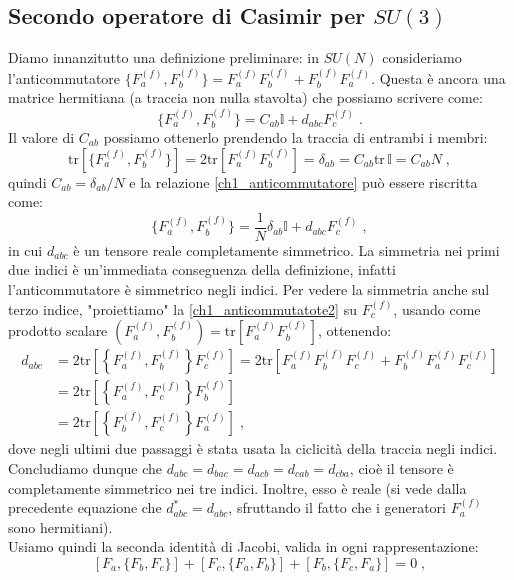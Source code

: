 \documentclass[12pt,a4paper]{article}
\theoremstyle{definition}
\newcommand{\tr}{\mathrm{tr}}
\numberwithin{equation}{section}
\begin{document}
\subsection{Secondo operatore di Casimir per $SU(3)$}
Diamo innanzitutto una definizione preliminare: in $SU(N)$ consideriamo l'anticommutatore $\{F_a^{(f)},F_b^{(f)}\}=F_a^{(f)}F_b^{(f)}+F_b^{(f)}F_a^{(f)}$. Questa è ancora una matrice hermitiana (a traccia non nulla stavolta) che possiamo scrivere come:
\begin{equation}
\{F_a^{(f)},F_b^{(f)}\}=C_{ab}\mathbb{I}+d_{abc}F_c^{(f)}\;. \label{ch1_anticommutatore}
\end{equation}
Il valore di $C_{ab}$ possiamo ottenerlo prendendo la traccia di entrambi i membri:
$$
\tr\left[\{F_a^{(f)},F_b^{(f)}\}\right]=2\tr[F_a^{(f)}F_b^{(f)}]=\delta_{ab}=C_{ab}\tr\,\mathbb{I}=C_{ab}N\;,
$$
quindi $C_{ab}=\delta_{ab}/N$ e la relazione \eqref{ch1_anticommutatore} può essere riscritta come:
\begin{equation}
\{F_a^{(f)},F_b^{(f)}\}=\frac{1}{N}\delta_{ab}\mathbb{I}+d_{abc}F_c^{(f)}\;, \label{ch1_anticommutatote2}
\end{equation}
in cui $d_{abc}$ è un tensore reale completamente simmetrico. La simmetria nei primi due indici è un'immediata conseguenza della definizione, infatti l'anticommutatore è simmetrico negli indici. Per vedere la simmetria anche sul terzo indice, "proiettiamo" la \eqref{ch1_anticommutatote2} su $F_c^{(f)}$, usando come prodotto scalare $(F_a^{(f)},F_b^{(f)})=\tr[F_a^{(f)}F_b^{(f)}]$, ottenendo:
\begin{align*}
d_{abc}&= 2\tr\left[\left\{F_a^{(f)},F_b^{(f)}\right\}F_c^{(f)}\right]=2\tr\left[F_a^{(f)}F_b^{(f)}F_c^{(f)}+F_b^{(f)}F_a^{(f)}F_c^{(f)}\right] \\
&= 2\tr\left[\left\{F_a^{(f)},F_c^{(f)}\right\}F_b^{(f)}\right] \\
&=2 \tr\left[\left\{F_b^{(f)},F_c^{(f)}\right\}F_a^{(f)}\right]\;,
\end{align*}
dove negli ultimi due passaggi è stata usata la ciclicità della traccia negli indici. Concludiamo dunque che $d_{abc}=d_{bac}=d_{acb}=d_{cab}=d_{cba}$, cioè il tensore è completamente simmetrico nei tre indici. Inoltre, esso è reale (si vede dalla precedente equazione che $d_{abc}^*=d_{abc}$, sfruttando il fatto che i generatori $F_a^{(f)}$ sono hermitiani). \\
Usiamo quindi la seconda identità di Jacobi, valida in ogni rappresentazione:
\begin{equation}
\left[F_a,\{F_b,F_c\}\right]+\left[F_c,\{F_a,F_b\}\right]+\left[F_b,\{F_c,F_a\}\right]=0\;,
\end{equation}
\end{document}
